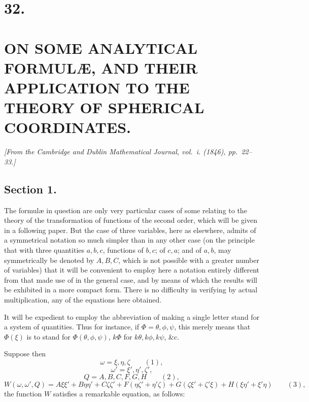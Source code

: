\documentclass[11pt]{article}
\begin{document}
\newpage
\section*{32.}
\section*{ON SOME ANALYTICAL FORMUL\AE, AND THEIR APPLICATION TO THE THEORY OF SPHERICAL COORDINATES.}

\textit{[From the Cambridge and Dublin Mathematical Journal, vol.~i. (1846), pp.~22--33.]}

\bigskip
\setcounter{page}{213}

\subsection*{Section 1.}

The formul\ae{} in question are only very particular cases of some relating to the theory of the transformation of functions of the second order, which will be given in a following paper. But the case of three variables, here as elsewhere, admits of a symmetrical notation so much simpler than in any other case (on the principle that with three quantities $a, b, c$, functions of $b, c$; of $c, a$; and of $a, b$, may symmetrically be denoted by $A, B, C$, which is not possible with a greater number of variables) that it will be convenient to employ here a notation entirely different from that made use of in the general case, and by means of which the results will be exhibited in a more compact form. There is no difficulty in verifying by actual multiplication, any of the equations here obtained.

It will be expedient to employ the abbreviation of making a single letter stand for a system of quantities. Thus for instance, if $\Phi = \theta, \phi, \psi$, this merely means that $\Phi(\xi)$ is to stand for $\Phi(\theta, \phi, \psi)$, $k\Phi$ for $k\theta, k\phi, k\psi$, \&c.

Suppose then
\[
\omega = \xi, \eta, \zeta \qquad (1),
\]
\[
\omega' = \xi', \eta', \zeta',
\]
\[
Q = A, B, C, F, G, H \qquad (2),
\]
\[
W(\omega, \omega', Q) = A\xi\xi' + B\eta\eta' + C\zeta\zeta' + F(\eta\zeta' + \eta'\zeta) + G(\zeta\xi' + \zeta'\xi) + H(\xi\eta' + \xi'\eta) \qquad (3),
\]
the function $W$ satisfies a remarkable equation, as follows:
\end{document}
